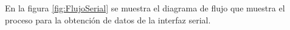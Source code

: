 %
%
%		
%		
%
%	
%	
%

En la figura \ref{fig:FlujoSerial} se muestra el diagrama de flujo que muestra el proceso para la obtención de datos de la interfaz serial.\\

